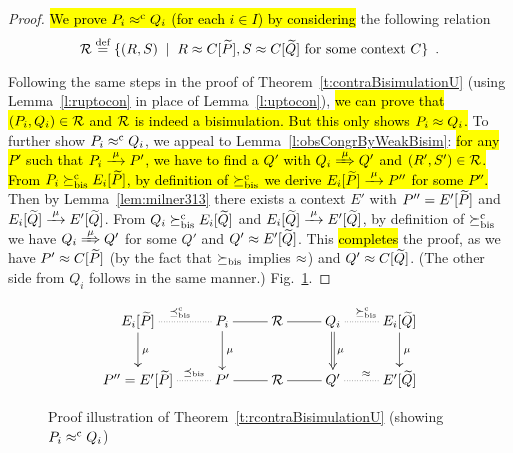 \begin{proof}
\hl{We  prove $P_i \mathrel{\approx^{\rm{c}}} Q_i$ (for each $i \in I$) by considering}
the following relation
\begin{equation*}
{\cal R} \stackrel{\mbox{\scriptsize def}}{=} \{(R,S) \; \mid \; R \approx C [\widetilde P], S \approx C [\widetilde Q] \mbox{~for some context
$C$} \} \enspace.
\end{equation*}

Following the same steps in the proof of
Theorem~\ref{t:contraBisimulationU}
(using Lemma~\ref{l:ruptocon}
in place of Lemma~\ref{l:uptocon}), \hl{we can prove that $(P_i, Q_i)
\in{\cal R}$ and ${\cal R}$ is indeed a bisimulation. But this only shows $P_i \approx Q_i$.}
%
To further show $P_i \mathrel{\approx^{\rm{c}}} Q_i$, we appeal to
Lemma~\ref{l:obsCongrByWeakBisim}: \hl{for any $P'$ such that $P_i \arr{\mu} P'$, we have to
  find a $Q'$ with $Q_i \Arr{\mu} Q'$ and $(R',S') \in {\cal R}$.
%
From $P_i \mathrel{\succeq^{\rm{c}}_{\rm{bis}}} E_i[{\widetilde P}]$, by definition of $\mathrel{\succeq^{\rm{c}}_{\rm{bis}}}$ we derive $E_i[{\til P}] \arr{\mu}
P''$ for some $P''$.} Then by Lemma~\ref{lem:milner313} there exists a context
$E'$ with $P'' = E'[{\widetilde P}]$ and $E_i[{\til Q}] \arr{\mu} E'[{\til Q}]$.
%
From $Q_i \mathrel{\succeq^{\rm{c}}_{\rm{bis}}} E_i[{\widetilde Q}]$ and $E_i[{\til Q}] \arr{\mu} E'[{\til
  Q}]$, by definition of $\mathrel{\succeq^{\rm{c}}_{\rm{bis}}}$ we have $Q_i \Arr{\mu} Q'$ for some
$Q'$ and $Q' \approx E'[{\widetilde Q}]$. This \hl{completes} the proof, as we have
$P' \approx C[{\widetilde P}]$ (by the fact that $\mathrel{\succeq_{\rm{bis}}}$ implies $\approx$) and
$Q' \approx C[{\widetilde Q}]$. (The other side from $Q_i$ follows in the same manner.)
 Fig.~\ref{fig:314}.
\end{proof}

\begin{figure}[ht]
\begin{displaymath}
  \xymatrix{
    {E_i[{\til P}]} \ar@{.}[r]^{\preceq^{\mathrm{c}}_{\mathrm{bis}}} \ar@{->}[d]^{\mu} & {P_i} \ar@{-}[r]
    \ar@{->}[d]^{\mu} & {\R} \ar@{-}[r] & {Q_i} \ar@{.}[r]^{\rcontr}
    \ar@{=>}[d]^{\mu} & {E_i[{\til Q}]} \ar@{->}[d]^{\mu} \\
    {P'' = E'[{\til P}]} \ar@{.}[r]^{\qquad\preceq_{\mathrm{bis}}} & {P'} \ar@{-}[r] & {\R} \ar@{-}[r] & {Q'} \ar@{.}[r]^{\wb} 
    & {E'[{\til Q}]} \\
  }
\end{displaymath}
\caption{Proof illustration of Theorem~\ref{t:rcontraBisimulationU}
  (showing $P_i \mathrel{\approx^{\rm{c}}} Q_i$)}
\label{fig:314}
\end{figure}
